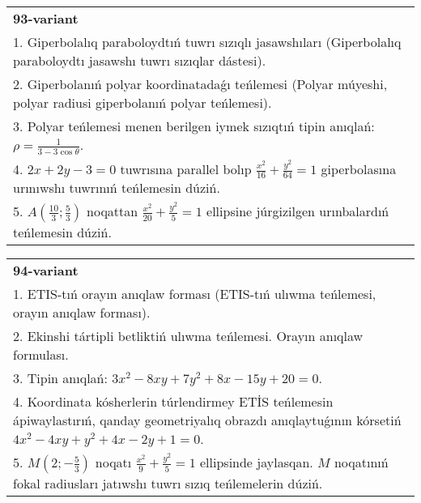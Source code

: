 \documentclass{article}
\begin{document}
\begin{tabular}{m{17cm}}
\textbf{93-variant}\\
1. Giperbolalıq paraboloydtıń tuwrı sızıqlı jasawshıları (Giperbolalıq paraboloydtı jasawshı tuwrı sızıqlar dástesi).\\

2. Giperbolanıń polyar koordinatadaǵı teńlemesi (Polyar múyeshi, polyar radiusi giperbolanıń polyar teńlemesi).\\

3. Polyar teńlemesi menen berilgen iymek sızıqtıń tipin anıqlań: $\rho=\frac{1}{3-3\cos\theta}$.\\

4. $2x + 2y - 3 = 0$ tuwrısına parallel bolıp $\frac{x^{2}}{16} + \frac{y^{2}}{64} = 1$ giperbolasına urınıwshı tuwrınıń teńlemesin dúziń.  \\

5. $A(\frac{10}{3};\frac{5}{3})$ noqattan $\frac{x^{2}}{20} + \frac{y^{2}}{5} = 1$ ellipsine júrgizilgen urınbalardıń teńlemesin dúziń.  
\end{tabular}
\vspace{1cm}


\begin{tabular}{m{17cm}}
\textbf{94-variant}\\
1. ETIS-tıń orayın anıqlaw forması (ETIS-tıń ulıwma teńlemesi, orayın anıqlaw forması).\\

2. Ekinshi tártipli betliktiń ulıwma teńlemesi. Orayın anıqlaw formulası.\\

3. Tipin anıqlań: $3 x^{2}-8 xy+7 y^{2}+8 x-15 y+20=0$.\\

4. Koordinata kósherlerin túrlendirmey ETİS teńlemesin ápiwaylastırıń, qanday geometriyalıq obrazdı anıqlaytuǵının kórsetiń $4x^{2} - 4xy + y^{2} + 4x - 2y + 1 = 0$.  \\

5. $M(2; - \frac{5}{3})$ noqatı $\frac{x^{2}}{9} + \frac{y^{2}}{5} = 1$ ellipsinde jaylasqan. $M$ noqatınıń fokal radiusları jatıwshı tuwrı sızıq teńlemelerin dúziń.  
\end{tabular}
\vspace{1cm}
\end{document}
